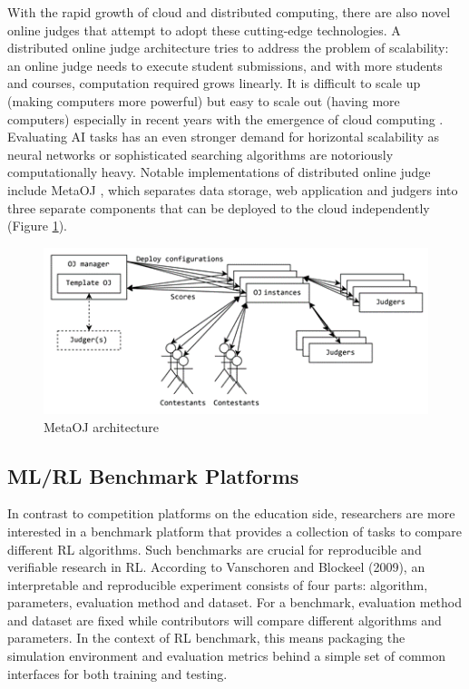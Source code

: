 \documentclass[fyp]{socreport}
\begin{document}
With the rapid growth of cloud and distributed computing, there are also novel online judges that attempt to adopt these cutting-edge technologies. A distributed online judge architecture tries to address the problem of scalability: an online judge needs to execute student submissions, and with more students and courses, computation required grows linearly. It is difficult to scale up (making computers more powerful) but easy to scale out (having more computers) especially in recent years with the emergence of cloud computing \cite{RN17}. Evaluating AI tasks has an even stronger demand for horizontal scalability as neural networks or sophisticated searching algorithms are notoriously computationally heavy. Notable implementations of distributed online judge include MetaOJ \cite{metaoj}, which separates data storage, web application and judgers into three separate components that can be deployed to the cloud independently (Figure \ref{fig:metaoj}).

\begin{figure}[H]
    \centering
    \includegraphics{images/metaoj.png}
    \caption{MetaOJ architecture}
    \label{fig:metaoj}
\end{figure}

\subsection{ML/RL Benchmark Platforms}
In contrast to competition platforms on the education side, researchers are more interested in a benchmark platform that provides a collection of tasks to compare different RL algorithms. Such benchmarks are crucial for reproducible and verifiable research in RL. According to Vanschoren and Blockeel (2009), an interpretable and reproducible experiment consists of four parts: algorithm, parameters, evaluation method and dataset. For a benchmark, evaluation method and dataset are fixed while contributors will compare different algorithms and parameters. In the context of RL benchmark, this means packaging the simulation environment and evaluation metrics behind a simple set of common interfaces for both training and testing.
\end{document}
